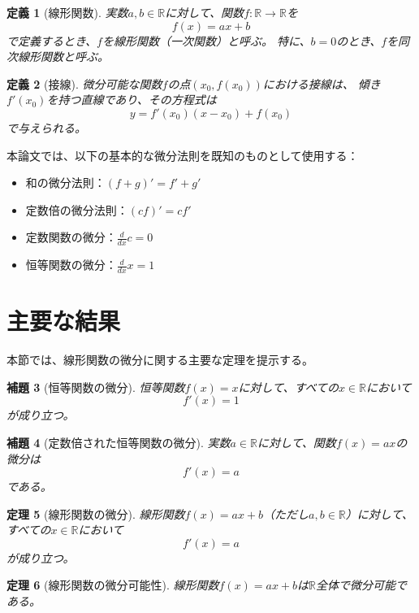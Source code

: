 \documentclass[a4paper,11pt]{jlreq}
\newtheorem{theorem}{定理}[section]
\newtheorem{definition}[theorem]{定義}
\newtheorem{lemma}[theorem]{補題}
\begin{document}
\begin{definition}[線形関数]
実数$a, b \in \mathbb{R}$に対して、関数$f: \mathbb{R} \to \mathbb{R}$を
\[
f(x) = ax + b
\]
で定義するとき、$f$を線形関数（一次関数）と呼ぶ。
特に、$b = 0$のとき、$f$を同次線形関数と呼ぶ。
\end{definition}

\begin{definition}[接線]
微分可能な関数$f$の点$(x_0, f(x_0))$における接線は、
傾き$f'(x_0)$を持つ直線であり、その方程式は
\[
y = f'(x_0)(x - x_0) + f(x_0)
\]
で与えられる。
\end{definition}

本論文では、以下の基本的な微分法則を既知のものとして使用する：
\begin{itemize}
\item 和の微分法則：$(f + g)' = f' + g'$
\item 定数倍の微分法則：$(cf)' = cf'$
\item 定数関数の微分：$\frac{d}{dx}c = 0$
\item 恒等関数の微分：$\frac{d}{dx}x = 1$
\end{itemize}

\section{主要な結果}

本節では、線形関数の微分に関する主要な定理を提示する。

\begin{lemma}[恒等関数の微分]
\label{lem:identity}
恒等関数$f(x) = x$に対して、すべての$x \in \mathbb{R}$において
\[
f'(x) = 1
\]
が成り立つ。
\end{lemma}

\begin{lemma}[定数倍された恒等関数の微分]
\label{lem:const_mul}
実数$a \in \mathbb{R}$に対して、関数$f(x) = ax$の微分は
\[
f'(x) = a
\]
である。
\end{lemma}

\begin{theorem}[線形関数の微分]
\label{thm:linear_deriv}
線形関数$f(x) = ax + b$（ただし$a, b \in \mathbb{R}$）に対して、
すべての$x \in \mathbb{R}$において
\[
f'(x) = a
\]
が成り立つ。
\end{theorem}

\begin{theorem}[線形関数の微分可能性]
\label{thm:differentiable}
線形関数$f(x) = ax + b$は$\mathbb{R}$全体で微分可能である。
\end{theorem}
\end{document}
